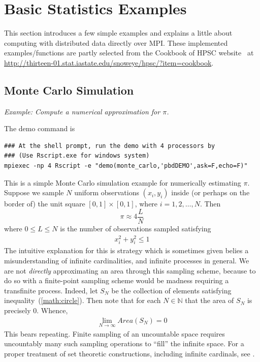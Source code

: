 \chapter[Basic Statistics Examples]{Basic Statistics Examples}
\label{sec:statistics_examples}

This section introduces a few simple examples and explains a little about
computing with distributed data directly over MPI. 
These implemented examples/functions are partly
selected from the Cookbook of HPSC website~\citep{hpsc2011} at
\url{http://thirteen-01.stat.iastate.edu/snoweye/hpsc/?item=cookbook}.



\section[Monte Carlo Simulation]{Monte Carlo Simulation}%
\label{sec:monte_carlo}

\emph{Example:  Compute a numerical approximation for $\pi$.}

The demo command is
\begin{lstlisting}
### At the shell prompt, run the demo with 4 processors by
### (Use Rscript.exe for windows system)
mpiexec -np 4 Rscript -e "demo(monte_carlo,'pbdDEMO',ask=F,echo=F)"
\end{lstlisting}

This is a simple Monte Carlo simulation example for numerically estimating
$\pi$.
Suppose we sample $N$ uniform observations $(x_i, y_i)$ inside (or perhaps on
the border of) the unit square $[0, 1]\times [0,1]$,
where $i = 1, 2, \ldots, N$.  Then
\begin{equation}
\pi \approx 4\frac{L}{N}
\label{eqn:pi}
\end{equation}
where $0\leq L\leq N$ is the number of observations sampled satisfying
\begin{align}
x_i^2+y_i^2 \leq 1\label{math:circle}
\end{align}
The intuitive explanation for this is strategy which is sometimes given belies
a misunderstanding of infinite cardinalities, and infinite processes in
general. We are not \emph{directly} approximating an area through this
sampling scheme, because to do so with a finite-point sampling scheme would
be madness requiring a transfinite process. Indeed, let $S_N$ be the
collection of elements satisfying inequality~(\ref{math:circle}).
Then note that for each $N\in\mathbb{N}$ that the area of $S_N$ is
precisely 0. Whence,
\begin{align*}
\lim_{N\rightarrow\infty} Area(S_N) = 0
\end{align*}
This bears repeating. Finite sampling of an uncountable space requires
uncountably many such sampling operations to ``fill'' the infinite space.
For a proper treatment of set theoretic constructions, including infinite
cardinals, see \citep{kunen}.

